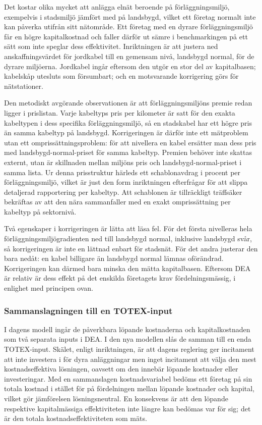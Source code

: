 \documentclass[11pt,a4paper]{article}
\begin{document}
Det kostar olika mycket att anlägga elnät beroende på förläggningsmiljö, exempelvis i stadsmiljö
jämfört med på landsbygd, vilket ett företag normalt inte kan påverka utifrån sitt nätområde. Ett
företag med en dyrare förläggningsmiljö får en högre kapitalkostnad och faller därför ut sämre i
benchmarkingen på ett sätt som inte speglar dess effektivitet. Inriktningen är att justera ned
anskaffningsvärdet för jordkabel till en gemensam nivå, landsbygd normal, för de dyrare miljöerna.
Jordkabel ingår eftersom den utgör en stor del av kapitalbasen; kabelskåp utesluts som
försumbart; och en motsvarande korrigering görs för nätstationer.

Den metodiskt avgörande observationen är att förläggningsmiljöns premie redan ligger i prislistan.
Varje kabeltyps pris per kilometer är satt för den exakta kabeltypen i dess specifika
förläggningsmiljö, så en stadskabel har ett högre pris än samma kabeltyp på landsbygd.
Korrigeringen är därför inte ett mätproblem utan ett omprissättningsproblem: för att nivellera en
kabel ersätter man dess pris med landsbygd-normal-priset för samma kabeltyp. Premien behöver inte
skattas externt, utan är skillnaden mellan miljöns pris och landsbygd-normal-priset i samma lista.
Ur denna prisstruktur härleds ett schablonavdrag i procent per förläggningsmiljö, vilket är just
den form inriktningen efterfrågar för att slippa detaljerad rapportering per kabeltyp. Att
schablonen är tillräckligt träffsäker bekräftas av att den nära sammanfaller med en exakt
omprissättning per kabeltyp på sektornivå.

Två egenskaper i korrigeringen är lätta att läsa fel. För det första nivelleras hela
förläggningsmiljögradienten ned till landsbygd normal, inklusive landsbygd svår, så korrigeringen
är inte en lättnad enbart för stadsnät. För det andra justerar den bara nedåt: en kabel billigare
än landsbygd normal lämnas oförändrad. Korrigeringen kan därmed bara minska den mätta
kapitalbasen. Eftersom DEA är relativ är dess effekt på det enskilda företagets krav
fördelningsmässig, i enlighet med principen ovan.

\subsubsection{Sammanslagningen till en TOTEX-input}

I dagens modell ingår de påverkbara löpande kostnaderna och kapitalkostnaden som två separata
inputs i DEA. I den nya modellen slås de samman till en enda TOTEX-input. Skälet, enligt
inriktningen, är att dagens reglering ger incitament att inte investera i för dyra anläggningar men
inget incitament att välja den mest kostnadseffektiva lösningen, oavsett om den innebär löpande
kostnader eller investeringar. Med en sammanslagen kostnadsvariabel bedöms ett företag på sin
totala kostnad i stället för på fördelningen mellan löpande kostnader och kapital, vilket gör
jämförelsen lösningsneutral. En konsekvens är att den löpande respektive kapitalmässiga
effektiviteten inte längre kan bedömas var för sig; det är den totala kostnadseffektiviteten som
mäts.
\end{document}
